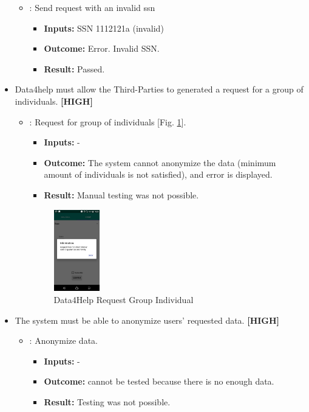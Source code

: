 \documentclass[a4paper, hidelinks, 12pt]{report}
\newcommand\requirement[1]{\item[{[REQ-#1]}] }
\newcommand\test[1]{\item[{[TEST-#1]}] }
\begin{document}
\begin{itemize}
\begin{itemize}
		\test{8} : Send request with an invalid ssn
			\begin{itemize}
			\item \textbf{Inputs: } SSN 1112121a (invalid)
			\item \textbf{Outcome: } Error. Invalid SSN.
			\item \textbf{Result: } Passed. 
			 \end{itemize}	
	\end{itemize}
	
	\requirement{10} Data4help must allow the Third-Parties to generated a request for a group of individuals.  \textbf{[HIGH]}
	
						\begin{itemize}
		\test{9}: Request for group of individuals [Fig. \ref{fig:request_group_individuals}].
			\begin{itemize}
			\item \textbf{Inputs: } -			
			\item \textbf{Outcome: } The system cannot anonymize the data (minimum amount of individuals is not satisfied), and error is displayed.
			\item \textbf{Result: } Manual testing was not possible.
			\end{itemize}
			\begin{figure}[H]
					\centering
				\includegraphics[width=0.2\textwidth]{images/request_group_individuals.jpeg}
					\caption[Data4Help Request Group Individual]{Data4Help Request Group Individual}
				\label{fig:request_group_individuals}
			\end{figure}

	\end{itemize}
	
	\requirement{11} The system must be able to anonymize users’ requested data. \textbf{[HIGH]}
	\begin{itemize}
		\test{10}: Anonymize data.
			\begin{itemize}
			\item \textbf{Inputs: } -			
			\item \textbf{Outcome: } cannot be tested because there is no enough data.
			\item \textbf{Result: } Testing was not possible. 
			\end{itemize}	
	\end{itemize}
	

\end{itemize}
\end{document}
